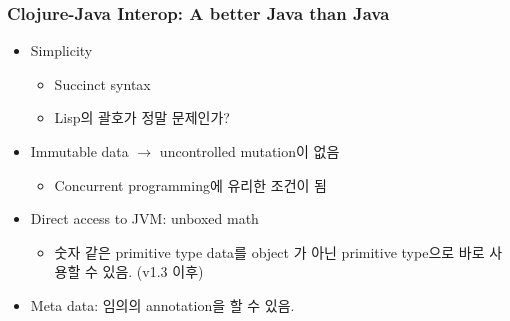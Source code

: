 \begin{frame}
\frametitle{Clojure-Java Interop: A better Java than Java}

\begin{itemize}
\item Simplicity
  \begin{itemize}
  \item Succinct syntax
  \item Lisp의 괄호가 정말 문제인가?
  \end{itemize}

\item Immutable data $\rightarrow$ uncontrolled mutation이 없음
  \begin{itemize}
  \item Concurrent programming에 유리한 조건이 됨
  \end{itemize}

\item Direct access to JVM: unboxed math
  \begin{itemize}
  \item 숫자 같은 primitive type data를 object 가 아닌 primitive
    type으로 바로 사용할 수 있음. (v1.3 이후)
  \end{itemize}

\item Meta data: 임의의 annotation을 할 수 있음.
\end{itemize}

\end{frame}
